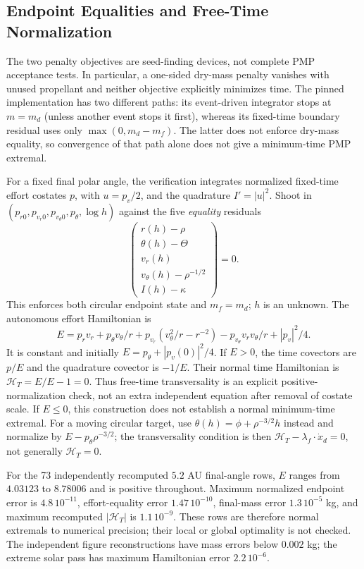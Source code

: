 \documentclass[journal,a4paper]{IEEEtran}
\begin{document}
\subsection{Endpoint Equalities and Free-Time Normalization}
\label{sec:acceptance}
The two penalty objectives are seed-finding devices, not complete PMP
acceptance tests. In particular, a one-sided dry-mass penalty vanishes
with unused propellant and neither objective explicitly minimizes time.
The pinned implementation has two different paths: its event-driven
integrator stops at $m=m_d$ (unless another event stops it first), whereas
its fixed-time boundary residual uses only
$\max(0,m_d-m_f)$. The latter does not enforce dry-mass equality, so convergence of that
path alone does not give a minimum-time PMP extremal.

For a fixed final polar angle, the verification integrates
normalized fixed-time effort costates $p$, with $u=p_v/2$, and the
quadrature $I'=|u|^2$. Shoot in
$(p_{r0},p_{v_r0},p_{v_\theta0},p_\theta,\log h)$ against the five
\emph{equality} residuals
\begin{equation}
 \begin{pmatrix}r(h)-\rho\\\theta(h)-\Theta\\v_r(h)\\
 v_\theta(h)-\rho^{-1/2}\\I(h)-\kappa\end{pmatrix}=0.
 \label{eq:corrected_residual}
\end{equation}
This enforces both circular endpoint state and $m_f=m_d$; $h$ is an
unknown.
The autonomous effort Hamiltonian is
\begin{equation}
 E=p_rv_r+p_\theta v_\theta/r
 +p_{v_r}(v_\theta^2/r-r^{-2})
 -p_{v_\theta}v_rv_\theta/r+|p_v|^2/4.
\end{equation}
It is constant and initially $E=p_\theta+|p_v(0)|^2/4$.
If $E>0$, the time covectors are $p/E$ and the quadrature covector
is $-1/E$. Their normal time Hamiltonian is $\mathcal H_T=E/E-1=0$.
Thus free-time transversality is an explicit positive-normalization
check, not an extra independent equation after removal of costate scale.
If $E\le0$, this construction does not establish a normal minimum-time
extremal. For a moving circular target, use
$\theta(h)=\phi+\rho^{-3/2}h$ instead and normalize by
$E-p_\theta\rho^{-3/2}$; the transversality condition is then
$\mathcal H_T-\lambda_f\cdot\dot x_d=0$, not generally $\mathcal H_T=0$.

For the 73 independently recomputed $5.2$ AU final-angle rows,
$E$ ranges from $4.03123$ to $8.78006$ and is positive throughout.
Maximum normalized endpoint error is $4.8\,10^{-11}$, effort-equality
error $1.47\,10^{-10}$, final-mass error $1.3\,10^{-5}$ kg, and
maximum recomputed $|\mathcal H_T|$ is $1.1\,10^{-9}$.
These rows are therefore normal extremals to numerical precision;
their local or global optimality is not checked.
The independent figure reconstructions have mass errors below $0.002$ kg;
the extreme solar pass has maximum Hamiltonian error $2.2\,10^{-6}$.
\end{document}
